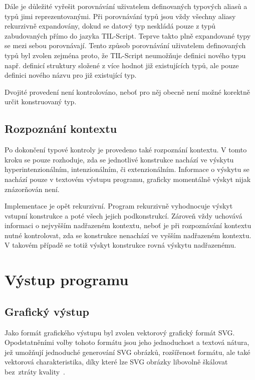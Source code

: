 \documentclass{article}
\begin{document}
Dále je důležité vyřešit porovnávání uživatelem definovaných typových aliasů a typů jimi reprezentovanými.
Při porovnávání typů jsou vždy všechny aliasy rekurzivně expandovány, dokud se datový typ neskládá pouze
z typů zabudovaných přímo do jazyka TIL-Script. Teprve takto plně expandované typy se mezi sebou porovnávají.
Tento způsob porovnávání uživatelem definovaných typů byl zvolen zejména proto, že TIL-Script neumožňuje
definici nového typu např. definicí struktury složené z více hodnot již existujících typů, ale pouze definici
nového názvu pro již existující typ.

Dvojité provedení není kontrolováno, neboť pro něj obecně není možné korektně určit konstruovaný typ.

\subsection{Rozpoznání kontextu}

Po dokončení typové kontroly je provedeno také rozpoznání kontextu. V tomto kroku se pouze rozhoduje, zda
se jednotlivé konstrukce nachází ve výskytu hyperintenzionálním, intenzionálním, či extenzionálním. Informace
o výskytu se nachází pouze v textovém výstupu programu, graficky momentálně výskyt nijak znázorňován není.

Implementace je opět rekurzivní. Program rekurzivně vyhodnocuje výskyt vstupní konstrukce a poté všech jejich
podkonstrukcí. Zároveň vždy uchovává informaci o nejvyšším nadřazeném kontextu, neboť je při rozpoznávání
kontextu nutné kontrolovat, zda se konstrukce nenachází ve vyšším nadřazeném kontextu. V takovém případě se
totiž výskyt konstrukce rovná výskytu nadřazenému.

\section{Výstup programu}

\subsection{Grafický výstup}

Jako formát grafického výstupu byl zvolen vektorový grafický formát SVG. Opodstatněními volby tohoto formátu
jsou jeho jednoduchost a textová nátura, jež umožňují jednoduché generování SVG obrázků, rozšířenost formátu,
ale také vektorová charakteristika, díky které lze SVG obrázky libovolně škálovat bez~ztráty kvality~\cite{svg-src}.
\end{document}
